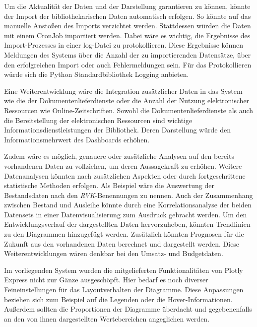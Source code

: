 Um die Aktualität der Daten und der Darstellung garantieren zu können, könnte der Import der bibliothekarischen Daten automatisch erfolgen. So könnte auf das manuelle
Anstoßen des Imports verzichtet werden. Stattdessen würden die Daten mit einem CronJob importiert werden. Dabei wäre es wichtig, die Ergebnisse des Import-Prozesses in einer log-Datei zu protokollieren. 
Diese Ergebnisse können Meldungen des Systems über die Anzahl der zu importierenden Datensätze, über den erfolgreichen Import oder auch Fehlermeldungen sein.
Für das Protokollieren würde sich die Python Standardbibliothek Logging anbieten.

Eine Weiterentwicklung wäre die Integration zusätzlicher Daten in das System wie die der Dokumentenlieferdienste oder die Anzahl der Nutzung elektronischer Ressourcen wie Online-Zeitschriften. 
Sowohl die Dokumentenlieferdienste als auch die Bereitstellung der elektronischen Ressourcen sind wichtige Informationsdienstleistungen der Bibliothek. 
Deren Darstellung würde den Informationsmehrwert des Dashboards erhöhen.


Zudem wäre es möglich, genauere oder zusätzliche Analysen auf den bereits vorhandenen Daten zu vollziehen, um deren Aussagekraft zu erhöhen.
Weitere Datenanalysen könnten nach zusätzlichen Aspekten oder durch fortgeschrittene statistische Methoden erfolgen. Als Beispiel wäre die Auswertung der Bestandsdaten nach den \textit{\acrshort{RVK}}-Benennungen
zu nennen. Auch der Zusammenhang zwischen Bestand und Ausleihe könnte durch eine Korrelationsanalyse der beiden Datensets in einer Datenvisualisierung zum Ausdruck gebracht werden.
Um den Entwicklungsverlauf der dargestellten Daten hervorzuheben, könnten Trendlinien zu den Diagrammen hinzugefügt werden. Zusätzlich könnten Prognosen
für die Zukunft aus den vorhandenen Daten berechnet und dargestellt werden. Diese Weiterentwicklungen wären denkbar bei den Umsatz- und Budgetdaten.




Im vorliegenden System wurden die mitgelieferten Funktionalitäten von Plotly Express nicht zur Gänze ausgeschöpft. Hier bedarf es noch diverser Feineinstellungen für das Layoutverhalten der Diagramme.
Diese Anpassungen beziehen sich zum Beispiel auf die Legenden oder die Hover-Informationen. Außerdem sollten die Proportionen der Diagramme überdacht und gegebenenfalls 
an den von ihnen dargestellten Wertebereichen angeglichen werden.

